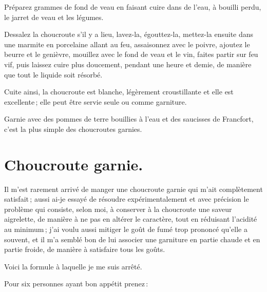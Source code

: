Préparez {\mmm} grammes de fond de veau en faisant cuire dans de l'eau,
à bouilli perdu, le jarret de veau et les légumes.

Dessalez la choucroute s'il y a lieu, lavez-la, égouttez-la, mettez-la ensuite
dans une marmite en porcelaine allant au feu, assaisonnez avec le poivre,
ajoutez le beurre et le genièvre, mouillez avec le fond de veau et le vin,
faites partir sur feu vif, puis laissez cuire plus doucement, pendant une heure
et demie, de manière que tout le liquide soit résorbé.

\medskip

Cuite ainsi, la choucroute est blanche, légèrement croustillante et elle est
excellente ; elle peut être servie seule ou comme garniture.

\medskip

Garnie avec des pommes de terre bouillies à l'eau et des saucisses de Francfort,
c'est la plus simple des choucroutes garnies.

\section*{\centering Choucroute garnie.}
{}

Il m'est rarement arrivé de manger une choucroute garnie qui m'ait complètement
satisfait ; aussi ai-je essayé de résoudre expérimentalement et avec précision
le problème qui consiste, selon moi, à conserver à la choucroute une saveur
aigrelette, de manière à ne pas en altérer le caractère, tout en réduisant
l'acidité au minimum ; j'ai voulu aussi mitiger le goût de fumé trop prononcé
qu'elle a souvent, et il m'a semblé bon de lui associer une garniture en partie
chaude et en partie froide, de manière à satisfaire tous les goûts.

Voici la formule à laquelle je me suis arrêté.

Pour six personnes ayant bon appétit prenez :

